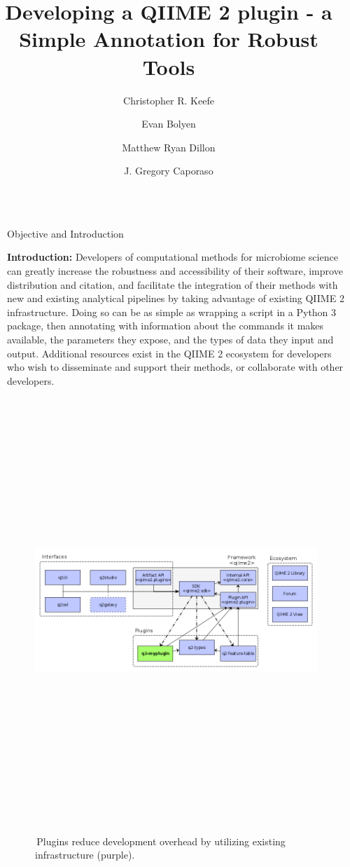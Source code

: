 \documentclass[final]{beamer}
\title{Developing a QIIME 2 plugin - a Simple Annotation for Robust Tools}
\author{Christopher R. Keefe \and Evan Bolyen \and Matthew Ryan Dillon \and J. Gregory Caporaso}
\institute[shortinst]{The Center for Applied Microbiome Science, Pathogen and Microbiome Institute, Northern Arizona University}
\newlength{\sepwidth}
\newlength{\colwidth}
\newcommand{\separatorcolumn}{\begin{column}{\sepwidth}\end{column}}
\begin{document}
\begin{frame}[t]
\begin{columns}[t]
\separatorcolumn

\begin{column}{\colwidth}

  \begin{block}{Objective and Introduction}

    \textbf{Introduction:}
    Developers of computational methods for microbiome science can greatly increase
    the robustness and accessibility of their software, improve distribution and citation,
    and facilitate the integration of their methods with new and existing analytical
    pipelines by taking advantage of existing QIIME 2 \cite{10.7287/peerj.preprints.27295v1}
    infrastructure. Doing so can be as simple as wrapping a script in a Python 3
    package, then annotating with information about the commands it makes available, the
    parameters they expose, and the types of data they input and output. Additional
    resources exist in the QIIME 2 ecosystem for developers who wish to disseminate and
    support their methods, or collaborate with other developers.
    \hfill\break

    \begin{figure}[tph!]
    {\includegraphics[height=16cm]{assets/infrastructure_diagram_bicolor}}
    \caption{\,Plugins reduce development overhead by utilizing existing infrastructure (purple).}
    \label{fig:infrastructure}
    \end{figure}


\end{block}
\end{column}
\end{columns}
\end{frame}
\end{document}
